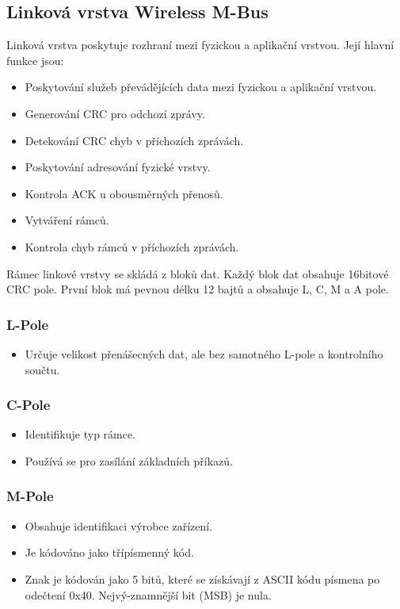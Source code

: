 \subsection{Linková vrstva Wireless M-Bus}

Linková vrstva poskytuje rozhraní mezi fyzickou a aplikační vrstvou. Její hlavní funkce jsou:
\begin{itemize}
	\item Poskytování služeb převádějících data mezi fyzickou a aplikační vrstvou.
	\item Generování CRC pro odchozí zprávy.
	\item Detekování CRC chyb v příchozích zprávách.
	\item Poskytování adresování fyzické vrstvy.
	\item Kontrola ACK u obousměrných přenosů.
	\item Vytváření rámců.
	\item Kontrola chyb rámců v příchozích zprávách.
\end{itemize}

Rámec linkové vrstvy se skládá z bloků dat. Každý blok dat obsahuje 16bitové CRC pole.  První blok má pevnou délku 12 bajtů a obsahuje L, C, M a A pole.

\subsubsection{L-Pole}
\begin{itemize}
	\item Určuje velikost přenášecných dat, ale bez samotného L-pole a kontrolního součtu.	
\end{itemize}

\subsubsection{C-Pole}
\begin{itemize}
	\item Identifikuje typ rámce.
	\item Používá se pro zasílání základních příkazů.
\end{itemize}

\subsubsection{M-Pole}
\begin{itemize}
	\item Obsahuje identifikaci výrobce zařízení.
	\item Je kódováno jako třípísmenný kód.
	\item Znak je kódován jako 5 bitů, které se získávají z ASCII kódu písmena po odečtení 0x40. Nejvý-znamnější bit (MSB) je nula.
\end{itemize}


